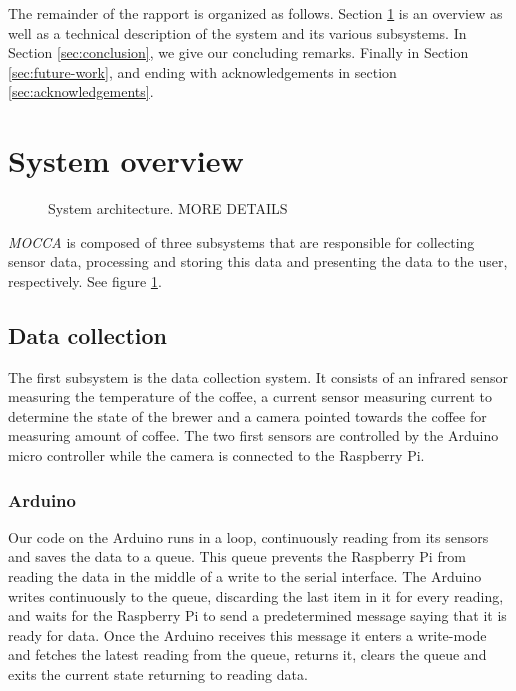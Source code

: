 \documentclass[12pt,a4paper,oneside,article]{memoir}
\numberwithin{equation}{chapter}
\begin{document}
The remainder of the rapport is organized as follows. Section 
\ref{sec:system-overview} is an overview as well as a technical
description of the system and its various subsystems. In Section
\ref{sec:conclusion}, we give our concluding remarks. Finally in Section 
\ref{sec:future-work}, and ending with acknowledgements in section 
\ref{sec:acknowledgements}.

\section{System overview}\label{sec:system-overview}
\begin{figure}[h]
  \centerfloat{}
  \scalebox{.75}{}
  \caption{System architecture. MORE DETAILS}\label{fig:architecture}
\end{figure}
\textit{MOCCA} is composed of three subsystems that are responsible for
collecting sensor data, processing and storing this data and presenting the data
to the user, respectively. See figure \ref{fig:architecture}.

\subsection{Data collection}\label{sec:data-collection}
The first subsystem is the data collection system. It consists of an 
infrared sensor measuring the temperature of the coffee, a current sensor 
measuring current to determine the state of the brewer and a camera pointed 
towards the coffee for measuring amount of coffee. The two first sensors are 
controlled by the Arduino micro controller while the camera is connected to the 
Raspberry Pi.

\subsubsection{Arduino}\label{sec:arduino}
Our code on the Arduino runs in a loop, continuously reading from its sensors 
and saves the data to a queue. This queue prevents the Raspberry Pi from 
reading the data in the middle of a write to the serial interface. The Arduino 
writes continuously to the queue, discarding the last item in it for every 
reading, and waits for the Raspberry Pi to send a predetermined message saying 
that it is ready for data. Once the Arduino receives this message it enters a 
write-mode and fetches the latest reading from the queue, returns it, clears the 
queue and exits the current state returning to reading data. 
\end{document}
